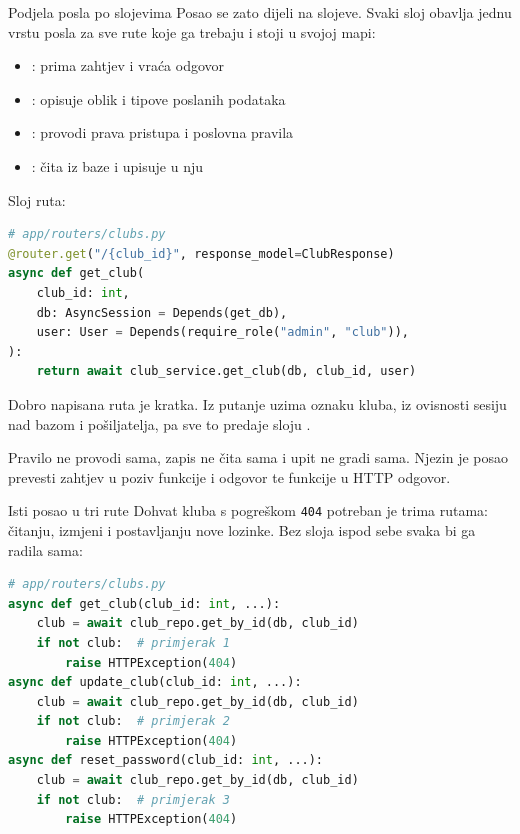 \begin{frame}{Podjela posla po slojevima}
Posao se zato dijeli na slojeve. Svaki sloj obavlja jednu vrstu posla za sve rute koje ga trebaju i stoji u svojoj mapi:

\vspace{0.9em}
\begin{itemize}
  \itemsep0.6em
  \item {}: prima zahtjev i vraća odgovor
  \item {}: opisuje oblik i tipove poslanih podataka
  \item {}: provodi prava pristupa i poslovna pravila
  \item {}: čita iz baze i upisuje u nju
\end{itemize}
\end{frame}

\begin{frame}[fragile]{Sloj ruta: }
\begin{lstlisting}[language=python]
# app/routers/clubs.py
@router.get("/{club_id}", response_model=ClubResponse)
async def get_club(
    club_id: int,
    db: AsyncSession = Depends(get_db),
    user: User = Depends(require_role("admin", "club")),
):
    return await club_service.get_club(db, club_id, user)
\end{lstlisting}

\vspace{0.4em}
Dobro napisana ruta je kratka. Iz putanje uzima oznaku kluba, iz ovisnosti sesiju nad bazom i pošiljatelja, pa sve to predaje sloju .

\vspace{1.1em}
Pravilo ne provodi sama, zapis ne čita sama i upit ne gradi sama. Njezin je posao prevesti zahtjev u poziv funkcije i odgovor te funkcije u HTTP odgovor.
\end{frame}

\begin{frame}[fragile]{Isti posao u tri rute}
Dohvat kluba s pogreškom \texttt{404} potreban je trima rutama: čitanju, izmjeni i postavljanju nove lozinke. Bez sloja ispod sebe svaka bi ga radila sama:

\begin{lstlisting}[language=python]
# app/routers/clubs.py
async def get_club(club_id: int, ...):
    club = await club_repo.get_by_id(db, club_id)
    if not club:  # primjerak 1
        raise HTTPException(404)
async def update_club(club_id: int, ...):
    club = await club_repo.get_by_id(db, club_id)
    if not club:  # primjerak 2
        raise HTTPException(404)
async def reset_password(club_id: int, ...):
    club = await club_repo.get_by_id(db, club_id)
    if not club:  # primjerak 3
        raise HTTPException(404)
\end{lstlisting}
\end{frame}

